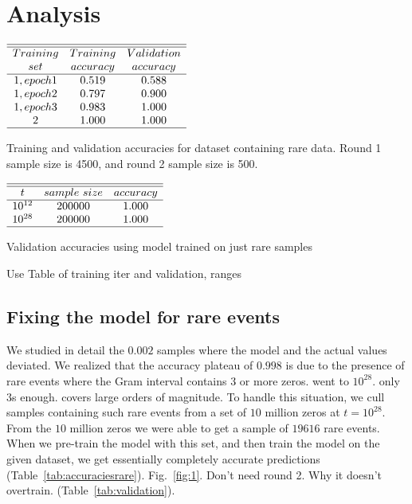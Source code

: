 \documentclass[journal]{IEEEtai}
\begin{document}
\section{Analysis}



\begin{table}
\centering \(\begin{array}{ccc}
\hline
\hline
Training  & Training &Validation  \\
set     &accuracy&accuracy\\
\hline
1, epoch 1  & 0.519 & 0.588 \\

1, epoch 2  & 0.797 & 0.900 \\
1, epoch 3  & 0.983 & 1.000 \\

2  & 1.000 & 1.000 \\
\hline
\end{array}\)
\caption{Training and validation accuracies for dataset containing rare data. Round 1 
sample size is 4500, and round 2 sample size is 500.}
\label{tab:accuraciesrare}
\end{table}

\begin{table}
\centering \(\begin{array}{ccc}
\hline
\hline
t     &sample~size&accuracy\\
\hline
10^{12}  & 200000 & 1.000 \\

10^{28}  & 200000 & 1.000 \\
\hline
\end{array}\)
\caption{Validation accuracies using model trained on just  rare samples}
\label{tab:validation}
\end{table}

Use 
Table of training iter and validation, ranges

\subsection{\label{rarefix}Fixing the model for rare events}
We studied in detail the $0.002$ samples where the model and the actual values deviated. 
We realized that the accuracy plateau of $0.998$ is due to the presence of rare events where the Gram interval contains $3$ or more zeros. went to $10^{28}$. only 3s enough. covers large orders of magnitude. To handle this situation, we cull samples containing such rare events from a set of $10$ million zeros at $t=10^{28}$. From the $10$ million zeros we were able to get a sample of $19616$ rare events. When we pre-train the model with this set, and then train the model on the given dataset, we get essentially completely accurate predictions (Table~\ref{tab:accuraciesrare}). Fig.~\ref{fig:1}.  Don't need round 2. Why it doesn't overtrain. (Table~\ref{tab:validation}).
\end{document}
